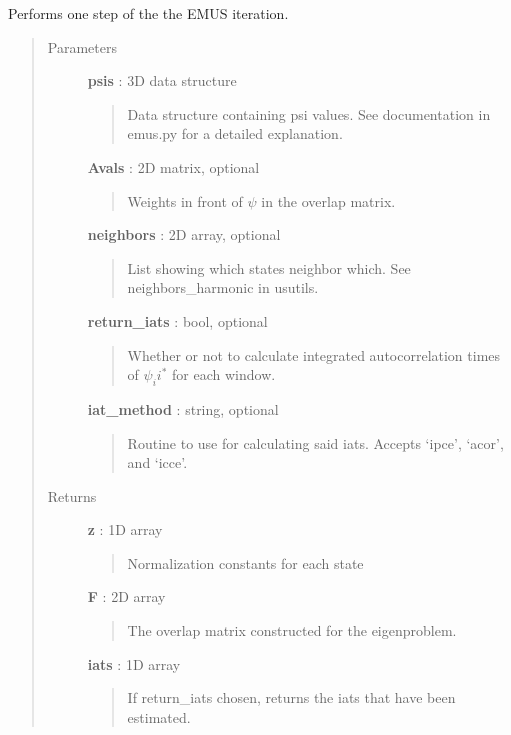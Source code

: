 \documentclass[letterpaper,10pt,english]{sphinxmanual}
\begin{document}
\begin{fulllineitems}
\label{modules/emusroutines:emusroutines.emus_iter}
Performs one step of the the EMUS iteration.
\begin{quote}\begin{description}
\item[{Parameters}] \leavevmode
\textbf{psis} : 3D data structure
\begin{quote}

Data structure containing psi values.  See documentation in emus.py for a detailed explanation.
\end{quote}

\textbf{Avals} : 2D matrix, optional
\begin{quote}

Weights in front of \(\psi\) in the overlap matrix.
\end{quote}

\textbf{neighbors} : 2D array, optional
\begin{quote}

List showing which states neighbor which.  See neighbors\_harmonic in usutils.
\end{quote}

\textbf{return\_iats} : bool, optional
\begin{quote}

Whether or not to calculate integrated autocorrelation times of \(\psi_ii^*\) for each window.
\end{quote}

\textbf{iat\_method} : string, optional
\begin{quote}

Routine to use for calculating said iats.  Accepts `ipce', `acor', and `icce'.
\end{quote}

\item[{Returns}] \leavevmode
\textbf{z} : 1D array
\begin{quote}

Normalization constants for each state
\end{quote}

\textbf{F} : 2D array
\begin{quote}

The overlap matrix constructed for the eigenproblem.
\end{quote}

\textbf{iats} : 1D array
\begin{quote}

If return\_iats chosen, returns the iats that have been estimated.
\end{quote}

\end{description}\end{quote}

\end{fulllineitems}
\end{document}
